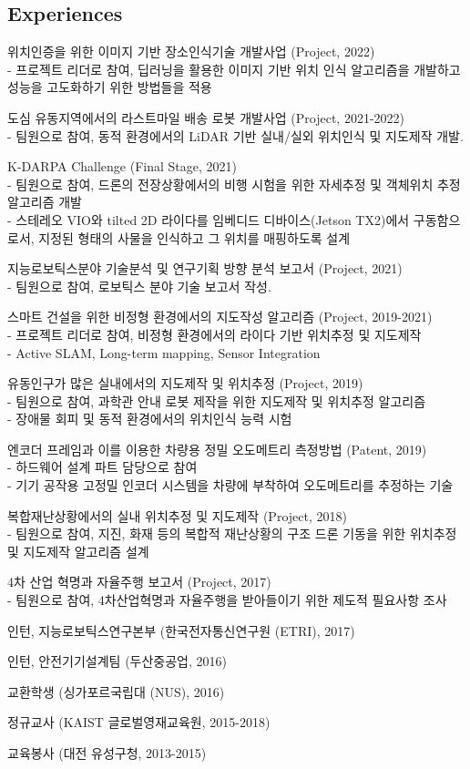 \documentclass[margin]{res}
\begin{document}
\begin{resume}
		\section{Experiences}
		\par	위치인증을 위한 이미지 기반 장소인식기술 개발사업 (Project, 2022) 
		\\- 프로젝트 리더로 참여, 딥러닝을 활용한 이미지 기반 위치 인식 알고리즘을 개발하고 성능을 고도화하기 위한 방법들을 적용
		\par	도심 유동지역에서의 라스트마일 배송 로봇 개발사업 (Project, 2021-2022) 
		\\- 팀원으로 참여, 동적 환경에서의 LiDAR 기반 실내/실외 위치인식 및 지도제작 개발.
		\par	K-DARPA Challenge (Final Stage, 2021)
		\\-	팀원으로 참여, 드론의 전장상황에서의 비행 시험을 위한 자세추정 및 객체위치 추정 알고리즘 개발
		\\-	스테레오 VIO와 tilted 2D 라이다를 임베디드 디바이스(Jetson TX2)에서 구동함으로서, 지정된 형태의 사물을 인식하고 그 위치를 매핑하도록 설계
		\par	지능로보틱스분야 기술분석 및 연구기획 방향 분석 보고서 (Project, 2021)
		\\-	팀원으로 참여, 로보틱스 분야 기술 보고서 작성.
		\par	스마트 건설을 위한 비정형 환경에서의 지도작성 알고리즘 (Project, 2019-2021)
		\\- 프로젝트 리더로 참여, 비정형 환경에서의 라이다 기반 위치추정 및 지도제작
		\\-	Active SLAM, Long-term mapping, Sensor Integration
		\par	유동인구가 많은 실내에서의 지도제작 및 위치추정 (Project, 2019)
		\\-	팀원으로 참여, 과학관 안내 로봇 제작을 위한 지도제작 및 위치추정 알고리즘
		\\-	장애물 회피 및 동적 환경에서의 위치인식 능력 시험
		\par	엔코더 프레임과 이를 이용한 차량용 정밀 오도메트리 측정방법 (Patent, 2019)
		\\-	하드웨어 설계 파트 담당으로 참여
		\\- 기기 공작용 고정밀 인코더 시스템을 차량에 부착하여 오도메트리를 추정하는 기술
		\par	복합재난상황에서의 실내 위치추정 및 지도제작 (Project, 2018)
		\\-	팀원으로 참여, 지진, 화재 등의 복합적 재난상황의 구조 드론 기동을 위한 위치추정 및 지도제작 알고리즘 설계
		\par	4차 산업 혁명과 자율주행 보고서 (Project, 2017)
		\\-	팀원으로 참여, 4차산업혁명과 자율주행을 받아들이기 위한 제도적 필요사항 조사
		\par	인턴, 지능로보틱스연구본부 (한국전자통신연구원 (ETRI), 2017)
		\par	인턴, 안전기기설계팀 (두산중공업, 2016)
		\par	교환학생 (싱가포르국립대 (NUS), 2016)
		\par	정규교사 (KAIST 글로벌영재교육원, 2015-2018)
		\par	교육봉사 (대전 유성구청, 2013-2015)
		

\end{resume}
\end{document}
